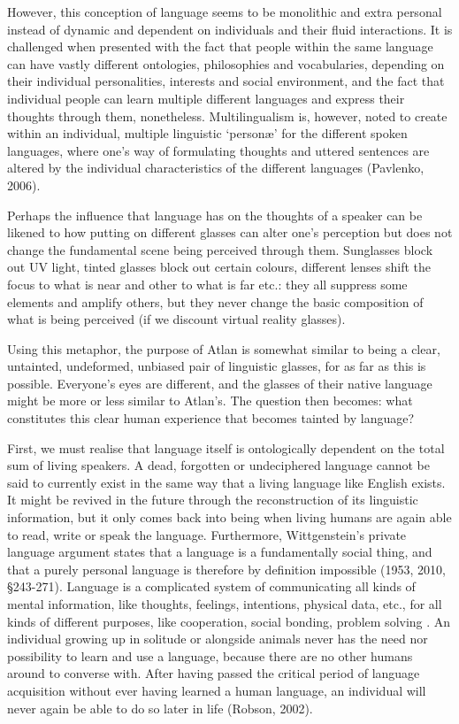 However, this conception of language seems to be monolithic and extra personal instead of dynamic and dependent on individuals and their fluid interactions. It is challenged when presented with the fact that people within the same language can have vastly different ontologies, philosophies and vocabularies, depending on their individual personalities, interests and social environment, and the fact that individual people can learn multiple different languages and express their thoughts through them, nonetheless. Multilingualism is, however, noted to create within an individual, multiple linguistic ‘personæ’ for the different spoken languages, where one’s way of formulating thoughts and uttered sentences are altered by the individual characteristics of the different languages  (Pavlenko, 2006). 

Perhaps the influence that language has on the thoughts of a speaker can be likened to how putting on different glasses can alter one’s perception but does not change the fundamental scene being perceived through them. Sunglasses block out UV light, tinted glasses block out certain colours, different lenses shift the focus to what is near and other to what is far etc.: they all suppress some elements and amplify others, but they never change the basic composition of what is being perceived (if we discount virtual reality glasses). 

Using this metaphor, the purpose of Atlan is somewhat similar to being a clear, untainted, undeformed, unbiased pair of linguistic glasses, for as far as this is possible. Everyone's eyes are different, and the glasses of their native language might be more or less similar to Atlan’s. The question then becomes: what constitutes this clear human experience that becomes tainted by language?  

First, we must realise that language itself is ontologically dependent on the total sum of living speakers. A dead, forgotten or undeciphered language cannot be said to currently exist in the same way that a living language like English exists. It might be revived in the future through the reconstruction of its linguistic information, but it only comes back into being when living humans are again able to read, write or speak the language. Furthermore, Wittgenstein’s private language argument states that a language is a fundamentally social thing, and that a purely personal language is therefore by definition impossible (1953, 2010, \S 243-271). Language is a complicated system of communicating all kinds of mental information, like thoughts, feelings, intentions, physical data, etc., for all kinds of different purposes, like cooperation, social bonding, problem solving . An individual growing up in solitude or alongside animals never has the need nor possibility to learn and use a language, because there are no other humans around  to converse with. After having passed the critical period of language acquisition without ever having learned a human language, an individual will never again be able to do so later in life (Robson, 2002).  

